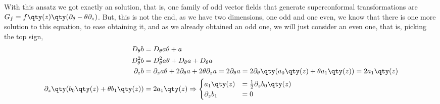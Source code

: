 With this ansatz we got exactly an solution, that is, one family of odd vector fields that generate superconformal transformations are $G_f=f\qty(z)\qty(\partial_\theta-\theta\partial_z)$. 
But, this is not the end, as we have two dimensions, one odd and one even, we know that there is one more solution to this equation, to ease 
obtaining it, and as we already obtained an odd one, we will just consider an even one, that is, picking the top sign,
\begin{align*}
    D_\theta b&=D_\theta a\theta+a\\
    D^2_\theta b&=D^2_\theta a\theta +D_\theta a+D_\theta a\\
    \partial_z b&=\partial _z a\theta +2\partial_\theta a+2\theta\partial_z a=2\partial_\theta a=2\partial_\theta\qty(a_0\qty(z)+\theta a_1\qty(z))=2a_1\qty(z)\\
    \partial_z \qty(b_0\qty(z)+\theta b_1\qty(z))&=2a_1\qty(z)\Rightarrow\begin{cases}a_1\qty(z)&=\frac12\partial_z b_0\qty(z)\\\partial_z b_1&=0\end{cases}
\end{align*}